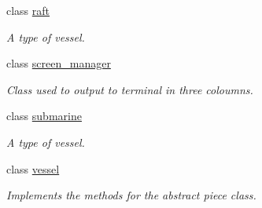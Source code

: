 \begin{DoxyCompactItemize}
class \hyperlink{classbattle__ship_1_1raft}{raft}
\begin{DoxyCompactList}\small\item\em A type of vessel. \end{DoxyCompactList}\item 
class \hyperlink{classbattle__ship_1_1screen__manager}{screen\+\_\+manager}
\begin{DoxyCompactList}\small\item\em Class used to output to terminal in three coloumns. \end{DoxyCompactList}\item 
class \hyperlink{classbattle__ship_1_1submarine}{submarine}
\begin{DoxyCompactList}\small\item\em A type of vessel. \end{DoxyCompactList}\item 
class \hyperlink{classbattle__ship_1_1vessel}{vessel}
\begin{DoxyCompactList}\small\item\em Implements the methods for the abstract piece class. \end{DoxyCompactList}\end{DoxyCompactItemize}
